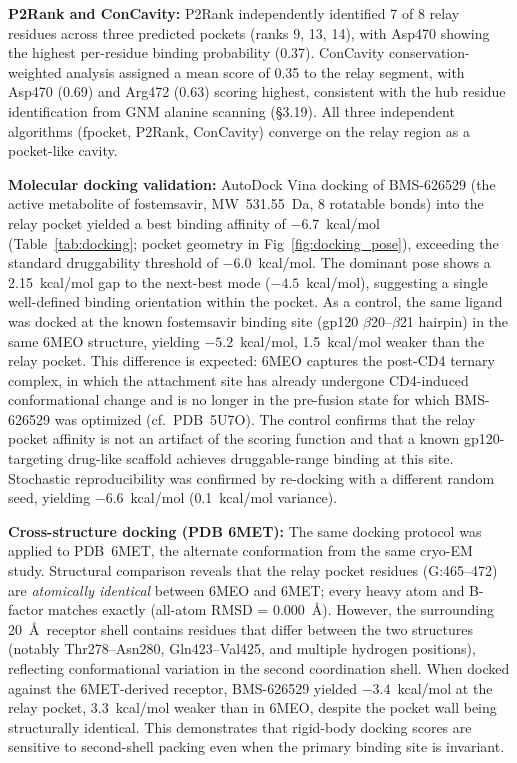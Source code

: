 \documentclass[11pt,a4paper]{article}
\begin{document}
\textbf{P2Rank and ConCavity:} P2Rank \citep{Krivak2018} independently identified 7 of 8 relay residues across three predicted pockets (ranks 9, 13, 14), with Asp470 showing the highest per-residue binding probability (0.37). ConCavity \citep{Capra2009} conservation-weighted analysis assigned a mean score of 0.35 to the relay segment, with Asp470 (0.69) and Arg472 (0.63) scoring highest, consistent with the hub residue identification from GNM alanine scanning (\S3.19). All three independent algorithms (fpocket, P2Rank, ConCavity) converge on the relay region as a pocket-like cavity.

\textbf{Molecular docking validation:} AutoDock Vina docking of BMS-626529 (the active metabolite of fostemsavir, MW~531.55~Da, 8 rotatable bonds) into the relay pocket yielded a best binding affinity of $-6.7$~kcal/mol (Table~\ref{tab:docking}; pocket geometry in Fig~\ref{fig:docking_pose}), exceeding the standard druggability threshold of $-6.0$~kcal/mol. The dominant pose shows a 2.15~kcal/mol gap to the next-best mode ($-4.5$~kcal/mol), suggesting a single well-defined binding orientation within the pocket. As a control, the same ligand was docked at the known fostemsavir binding site (gp120 $\beta$20--$\beta$21 hairpin) in the same 6MEO structure, yielding $-5.2$~kcal/mol, 1.5~kcal/mol weaker than the relay pocket. This difference is expected: 6MEO captures the post-CD4 ternary complex, in which the attachment site has already undergone CD4-induced conformational change and is no longer in the pre-fusion state for which BMS-626529 was optimized (cf.\ PDB~5U7O). The control confirms that the relay pocket affinity is not an artifact of the scoring function and that a known gp120-targeting drug-like scaffold achieves druggable-range binding at this site. Stochastic reproducibility was confirmed by re-docking with a different random seed, yielding $-6.6$~kcal/mol (0.1~kcal/mol variance).

\textbf{Cross-structure docking (PDB 6MET):} The same docking protocol was applied to PDB~6MET, the alternate conformation from the same cryo-EM study. Structural comparison reveals that the relay pocket residues (G:465--472) are \emph{atomically identical} between 6MEO and 6MET; every heavy atom and B-factor matches exactly (all-atom RMSD = 0.000~\AA). However, the surrounding 20~\AA\ receptor shell contains residues that differ between the two structures (notably Thr278--Asn280, Gln423--Val425, and multiple hydrogen positions), reflecting conformational variation in the second coordination shell. When docked against the 6MET-derived receptor, BMS-626529 yielded $-3.4$~kcal/mol at the relay pocket, 3.3~kcal/mol weaker than in 6MEO, despite the pocket wall being structurally identical. This demonstrates that rigid-body docking scores are sensitive to second-shell packing even when the primary binding site is invariant.
\end{document}
